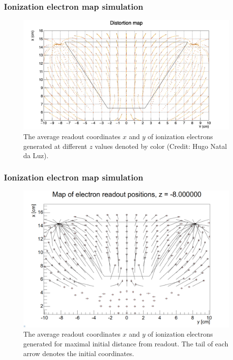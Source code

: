 \documentclass{beamer}
\begin{document}
	\begin{frame}
		\frametitle{Ionization electron map simulation}
		\begin{figure}
			\centering
			\includegraphics[height=0.6\textheight]{../images/map_dist.png}
			\caption{The average readout coordinates $x$ and $y$ of ionization electrons generated at different $z$ values denoted by color (Credit: Hugo Natal da Luz).}
		\end{figure}
	\end{frame}
	\begin{frame}
		\frametitle{Ionization electron map simulation}
		\begin{figure}
			\centering
			\includegraphics[height=0.65\textheight]{../images/map_dist2.png}
			\caption{The average readout coordinates $x$ and $y$ of ionization electrons generated for maximal initial distance from readout. The tail of each arrow denotes the initial coordinates.}
		\end{figure}
	\end{frame}
\end{document}
